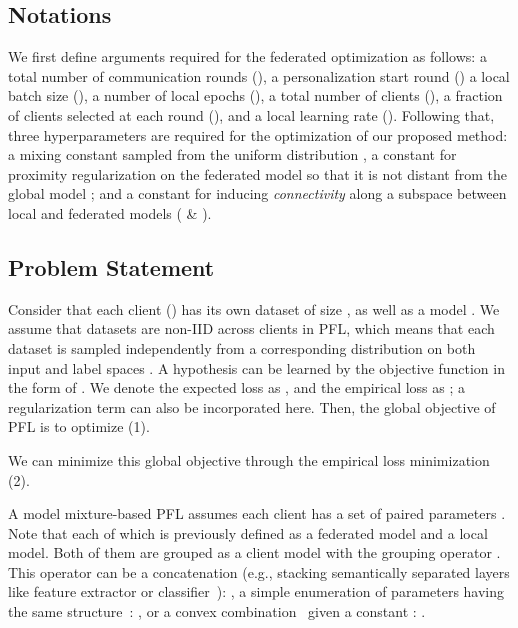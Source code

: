 \documentclass[sigconf]{acmart}
\begin{document}
\subsection{Notations} We first define arguments required for the federated optimization as follows: a total number of communication rounds (), a personalization start round () a local batch size (), a number of local epochs (), a total number of clients (), a fraction of clients selected at each round (), and a local learning rate (). Following that, three hyperparameters are required for the optimization of our proposed method: a mixing constant  sampled from the uniform distribution , a constant  for proximity regularization on the federated model  so that it is not distant from the global model ; and a constant  for inducing \textit{connectivity} along a subspace between local and federated models ( \& ).

\subsection{Problem Statement} Consider that each client  () has its own dataset  of size , as well as a model . We assume that datasets are non-IID across clients in PFL, which means that each dataset  is sampled independently from a corresponding distribution  on both input and label spaces . A hypothesis  can be learned by the objective function  in the form of . We denote the expected loss as , and the empirical loss as ; a regularization term  can also be incorporated here. Then, the global objective of PFL is to optimize (1).

\vspace{-2mm}

We can minimize this global objective through the empirical loss minimization (2).
 
A model mixture-based PFL assumes each client  has a set of paired parameters . Note that each of which is previously defined as a federated model and a local model. 
Both of them are grouped as a client model  with the grouping operator . This operator can be a concatenation (e.g., stacking semantically separated layers like feature extractor or classifier~\cite{fedrep, FedPer, lgfedavg}): , a simple enumeration of parameters having the same structure~\cite{ditto, pfedme}: , or a convex combination~\cite{apfl,mansour+20,l2sgd} given a constant : . 
\end{document}
